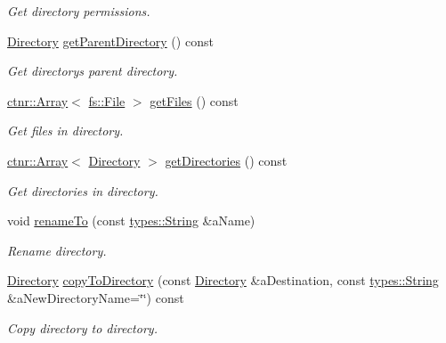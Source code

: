 \begin{DoxyCompactItemize}
\begin{DoxyCompactList}\small\item\em Get directory permissions. \end{DoxyCompactList}\item 
\hyperlink{classlibrary_1_1core_1_1fs_1_1Directory}{Directory} \hyperlink{classlibrary_1_1core_1_1fs_1_1Directory_ad17e782b4937e026064cf90e5b6150e6}{get\+Parent\+Directory} () const
\begin{DoxyCompactList}\small\item\em Get directory\textquotesingle{}s parent directory. \end{DoxyCompactList}\item 
\hyperlink{classlibrary_1_1core_1_1ctnr_1_1Array}{ctnr\+::\+Array}$<$ \hyperlink{classlibrary_1_1core_1_1fs_1_1File}{fs\+::\+File} $>$ \hyperlink{classlibrary_1_1core_1_1fs_1_1Directory_a9c80c3a09389bb6f024e9a9001dea432}{get\+Files} () const
\begin{DoxyCompactList}\small\item\em Get files in directory. \end{DoxyCompactList}\item 
\hyperlink{classlibrary_1_1core_1_1ctnr_1_1Array}{ctnr\+::\+Array}$<$ \hyperlink{classlibrary_1_1core_1_1fs_1_1Directory}{Directory} $>$ \hyperlink{classlibrary_1_1core_1_1fs_1_1Directory_a31ef325dea750ce2d7ecca49258c2a9a}{get\+Directories} () const
\begin{DoxyCompactList}\small\item\em Get directories in directory. \end{DoxyCompactList}\item 
void \hyperlink{classlibrary_1_1core_1_1fs_1_1Directory_abc9c7c9f9129950cd89c9dbd77978b8f}{rename\+To} (const \hyperlink{classlibrary_1_1core_1_1types_1_1String}{types\+::\+String} \&a\+Name)
\begin{DoxyCompactList}\small\item\em Rename directory. \end{DoxyCompactList}\item 
\hyperlink{classlibrary_1_1core_1_1fs_1_1Directory}{Directory} \hyperlink{classlibrary_1_1core_1_1fs_1_1Directory_a7d1bd71d46c8fd653cf237dc3ed5aa00}{copy\+To\+Directory} (const \hyperlink{classlibrary_1_1core_1_1fs_1_1Directory}{Directory} \&a\+Destination, const \hyperlink{classlibrary_1_1core_1_1types_1_1String}{types\+::\+String} \&a\+New\+Directory\+Name=\char`\"{}\char`\"{}) const
\begin{DoxyCompactList}\small\item\em Copy directory to directory. \end{DoxyCompactList}\item 

\end{DoxyCompactItemize}
